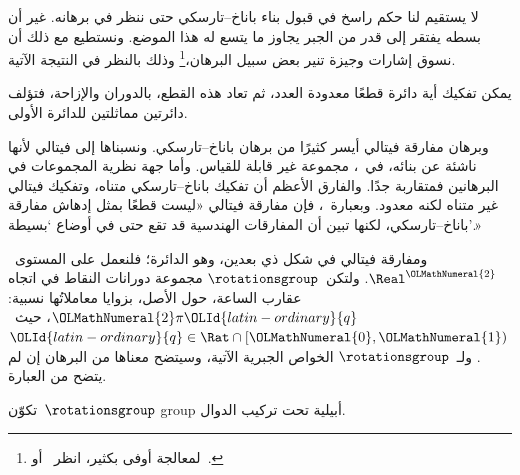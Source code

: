 \documentclass[../../../include/open-logic-section]{subfiles}
\begin{document}

لا يستقيم لنا حكم راسخ في قبول بناء باناخ--تارسكي حتى ننظر في برهانه.
غير أن بسطه يفتقر إلى قدر من الجبر يجاوز ما يتسع له هذا الموضع. ونستطيع
مع ذلك أن نسوق إشارات وجيزة تنير بعض سبيل البرهان،\footnote{لمعالجة
أوفى بكثير، انظر~\cite{Weston2003} أو~\cite{Wagon2016}.} وذلك بالنظر
في النتيجة الآتية.

\begin{thm}
يمكن تفكيك أية دائرة قطعًا معدودة العدد، ثم تعاد هذه القطع، بالدوران
والإزاحة، فتؤلف دائرتين مماثلتين للدائرة الأولى.
\end{thm}

وبرهان مفارقة فيتالي أيسر كثيرًا من برهان باناخ--تارسكي. ونسبناها إلى
فيتالي لأنها ناشئة عن بنائه، في~\citeyear{Vitali1905}، مجموعة غير
قابلة للقياس. وأما جهة نظرية المجموعات في البرهانين فمتقاربة جدًا.
والفارق الأعظم أن تفكيك باناخ--تارسكي متناه، وتفكيك فيتالي غير متناه
لكنه معدود. وبعبارة~\citet{Weston2003}، فإن مفارقة فيتالي «ليست
قطعًا بمثل إدهاش مفارقة باناخ--تارسكي، لكنها تبين أن المفارقات
الهندسية قد تقع حتى في أوضاع `بسيطة'.»

ومفارقة فيتالي في شكل ذي بعدين، وهو الدائرة؛ فلنعمل على
المستوى~$\Real^\OLMathNumeral{2}$. ولتكن~$\rotationsgroup$ مجموعة دورانات النقاط في
اتجاه عقارب الساعة، حول الأصل، بزوايا معاملاتُها نسبية:
$\OLMathNumeral{2}\pi \OLId{latin-ordinary}{q}$، حيث~$\OLId{latin-ordinary}{q} \in \Rat \cap [\OLMathNumeral{0},\OLMathNumeral{1})$. ولـ~$\rotationsgroup$ الخواص
الجبرية الآتية، وسيتضح معناها من البرهان إن لم يتضح من العبارة.

\begin{lem}
تكوّن~$\rotationsgroup$ {group} أبيلية تحت تركيب الدوال.
\end{lem}
\end{document}

